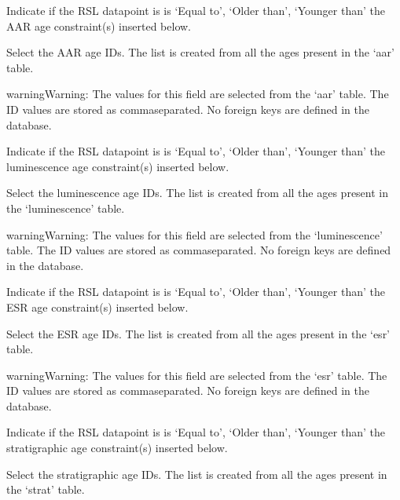 \documentclass[letterpaper,10pt,english]{sphinxmanual}
\begin{document}
 \sphinxhyphen{} Indicate if the RSL datapoint is is ‘Equal to’, ‘Older than’, ‘Younger than’ the AAR age constraint(s) inserted below.

 \sphinxhyphen{} Select the AAR age IDs. The list is created from all the ages present in the ‘aar’ table.

\begin{sphinxadmonition}{warning}{Warning:}
The values for this field are selected from the ‘aar’ table. The ID values are stored as comma\sphinxhyphen{}separated. No foreign keys are defined in the database.
\end{sphinxadmonition}

 \sphinxhyphen{} Indicate if the RSL datapoint is is ‘Equal to’, ‘Older than’, ‘Younger than’ the luminescence age constraint(s) inserted below.

 \sphinxhyphen{} Select the luminescence age IDs. The list is created from all the ages present in the ‘luminescence’ table.

\begin{sphinxadmonition}{warning}{Warning:}
The values for this field are selected from the ‘luminescence’ table. The ID values are stored as comma\sphinxhyphen{}separated. No foreign keys are defined in the database.
\end{sphinxadmonition}

 \sphinxhyphen{} Indicate if the RSL datapoint is is ‘Equal to’, ‘Older than’, ‘Younger than’ the ESR age constraint(s) inserted below.

 \sphinxhyphen{} Select the ESR age IDs. The list is created from all the ages present in the ‘esr’ table.

\begin{sphinxadmonition}{warning}{Warning:}
The values for this field are selected from the ‘esr’ table. The ID values are stored as comma\sphinxhyphen{}separated. No foreign keys are defined in the database.
\end{sphinxadmonition}

 \sphinxhyphen{} Indicate if the RSL datapoint is is ‘Equal to’, ‘Older than’, ‘Younger than’ the stratigraphic age constraint(s) inserted below.

 \sphinxhyphen{} Select the stratigraphic age IDs. The list is created from all the ages present in the ‘strat’ table.
\end{document}
